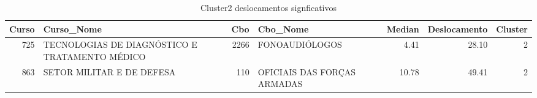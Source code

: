\begin{table}
\centering
\caption{Cluster2 deslocamentos signficativos }
\label{tab:Salarios_Cluster2}
\begin{tabular}{rlrlrrr}
\toprule
 Curso &                                     Curso\_Nome &  Cbo &                    Cbo\_Nome &  Median &  Deslocamento &  Cluster \\
\midrule
   725 & TECNOLOGIAS DE DIAGNÓSTICO E TRATAMENTO MÉDICO & 2266 &              FONOAUDIÓLOGOS &    4.41 &         28.10 &        2 \\
   863 &                      SETOR MILITAR E DE DEFESA &  110 & OFICIAIS DAS FORÇAS ARMADAS &   10.78 &         49.41 &        2 \\
\bottomrule
\end{tabular}
\end{table}
